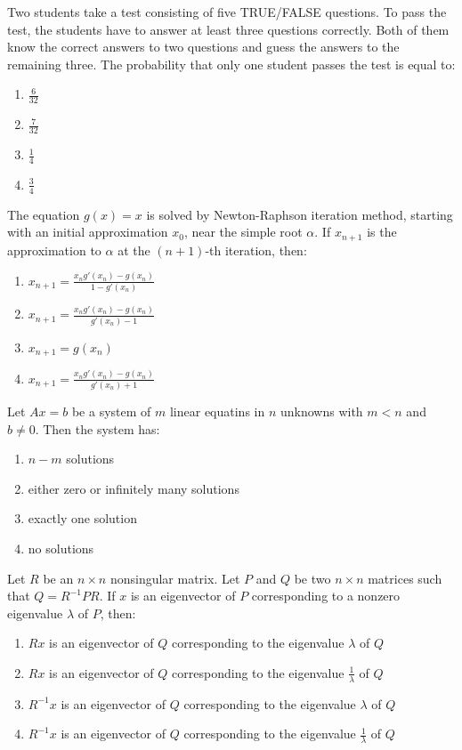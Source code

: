 \item Two students take a test consisting of five TRUE/FALSE questions. To pass the test, the students have to answer at least three questions correctly. Both of them know the correct answers to two questions and guess the answers to the remaining three. The probability that only one student passes the test is equal to:
    \begin{enumerate}
        \item $ \frac{6}{32} $
        \item $ \frac{7}{32} $
        \item $ \frac{1}{4} $
        \item $ \frac{3}{4} $
    \end{enumerate}
  
\item The equation $g(x) = x$ is solved by Newton-Raphson iteration method, starting with an initial approximation $x_0$, near the simple root $\alpha$. If $x_{n+1}$ is the approximation to $\alpha$ at the $(n+1)$-th iteration, then:
\begin{enumerate}
    \item $x_{n+1} = \frac{x_n g'(x_n) - g(x_n)}{1 - g'(x_n)}$
    \item $x_{n+1} = \frac{x_n g'(x_n) - g(x_n)}{g'(x_n) - 1}$
    \item $x_{n+1} = g(x_n)$
    \item $x_{n+1} = \frac{x_n g'(x_n) - g(x_n)}{g'(x_n) + 1}$
\end{enumerate}
\item Let $Ax = b$ be a system of $m$ linear equatins in $n$ unknowns with $m < n$ and $b \neq 0$. Then the system has:
\begin{enumerate}
    \item $n - m$ solutions
    \item either zero or infinitely many solutions
    \item exactly one solution
    \item no solutions
\end{enumerate}

\item Let $R$ be an $n \times n$ nonsingular matrix. Let $P$ and $Q$ be two $n \times n$ matrices such that $Q = R^{-1} P R$. If $x$ is an eigenvector of $P$ corresponding to a nonzero eigenvalue $\lambda$ of $P$, then:
\begin{enumerate}
    \item $R x$ is an eigenvector of $Q$ corresponding to the eigenvalue $\lambda$ of $Q$
    \item $R x$ is an eigenvector of $Q$ corresponding to the eigenvalue $\frac{1}{\lambda}$ of $Q$
    \item $R^{-1} x$ is an eigenvector of $Q$ corresponding to the eigenvalue $\lambda$ of $Q$
    \item $R^{-1} x$ is an eigenvector of $Q$ corresponding to the eigenvalue $\frac{1}{\lambda}$ of $Q$
\end{enumerate}

